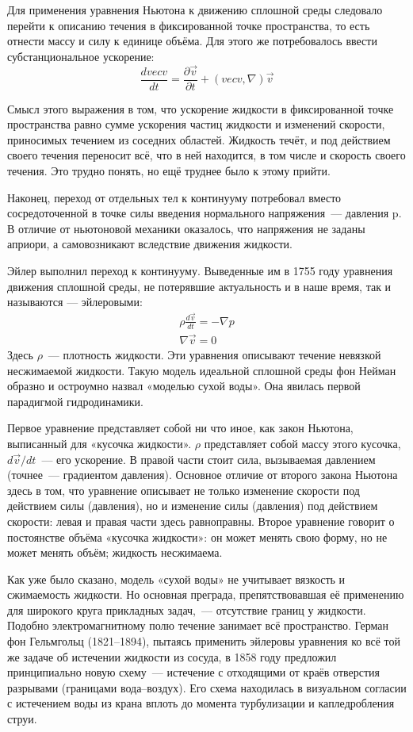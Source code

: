 Для применения уравнения Ньютона к движению сплошной среды следовало перейти к описанию течения в фиксированной 
точке пространства, то есть отнести массу и силу к единице объёма. Для этого же потребовалось ввести 
субстанциональное ускорение:
$$
\frac{d vec v}{d t} = \frac{\partial \vec v}{\partial t} + (vec v, \nabla) \vec v
$$

Смысл этого выражения в том, что ускорение жидкости в фиксированной точке пространства равно сумме ускорения 
частиц жидкости и изменений скорости, приносимых течением из соседних областей. Жидкость течёт, и под 
действием своего течения переносит всё, что в ней находится, в том числе и скорость своего течения. Это 
трудно понять, но ещё труднее было к этому прийти.

Наконец, переход от отдельных тел к континууму потребовал вместо сосредоточенной в точке силы введения 
нормального напряжения~--- давления p. В отличие от ньютоновой механики оказалось, что напряжения не заданы 
априори, а самовозникают вследствие движения жидкости.

Эйлер выполнил переход к континууму. Выведенные им в 1755 году уравнения движения сплошной среды, не 
потерявшие актуальность и в наше время, так и называются — эйлеровыми:
\begin{gather}
\rho \frac{d \vec v}{d t} = - \nabla p \\
\nabla \vec v = 0
\label{3}
\end{gather}
Здесь $\rho$~--- плотность жидкости. Эти уравнения описывают течение невязкой несжимаемой жидкости. 
Такую модель идеальной сплошной среды фон Нейман образно и остроумно назвал «моделью сухой воды». Она явилась
 первой парадигмой гидродинамики.

Первое уравнение представляет собой ни что иное, как закон Ньютона, выписанный для «кусочка жидкости». $\rho$ 
представляет собой массу этого кусочка, $ d \vec{v} / dt$~--- его ускорение. В правой части стоит сила, 
вызываемая давлением (точнее~--- градиентом давления). Основное отличие от второго закона Ньютона здесь в том,
что уравнение описывает не только изменение скорости под действием силы (давления), но и изменение силы (давления)
под действием скорости: левая и правая части здесь равноправны. Второе уравнение говорит о постоянстве объёма
 «кусочка жидкости»: он может менять свою форму, но не может менять объём; жидкость несжимаема.

Как уже было сказано, модель «сухой воды» не учитывает вязкость и сжимаемость жидкости. Но основная преграда, 
препятствовавшая её применению для широкого круга прикладных задач,~--- отсутствие границ у жидкости. Подобно 
электромагнитному полю течение занимает всё пространство. Герман фон Гельмгольц (1821--1894), пытаясь применить 
эйлеровы уравнения ко всё той же задаче об истечении жидкости из сосуда, в 1858 году предложил принципиально новую 
схему~--- истечение с отходящими от краёв отверстия разрывами (границами вода--воздух). Его схема находилась в 
визуальном согласии с истечением воды из крана вплоть до момента турбулизации и капледробления струи.

